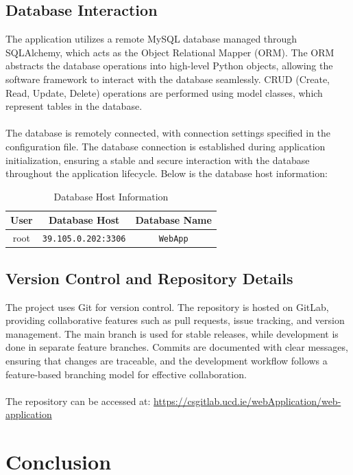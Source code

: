 \documentclass[12pt]{article}
\begin{document}
\subsection{Database Interaction}
The application utilizes a remote MySQL database managed through SQLAlchemy, which acts as the Object Relational Mapper (ORM). The ORM abstracts the database operations into high-level Python objects, allowing the software framework to interact with the database seamlessly. CRUD (Create, Read, Update, Delete) operations are performed using model classes, which represent tables in the database.\\ \\ 
The database is remotely connected, with connection settings specified in the configuration file. The database connection is established during application initialization, ensuring a stable and secure interaction with the database throughout the application lifecycle. Below is the database host information:

\begin{table}[H]
    \centering
    \begin{tabular}{|c|c|c|}
        \hline
        \textbf{User} & \textbf{Database Host} & \textbf{Database Name} \\
        \hline
        root & \texttt{39.105.0.202:3306} & \texttt{WebApp} \\
        \hline
    \end{tabular}
    \caption{Database Host Information}
\end{table}

\subsection{Version Control and Repository Details}
The project uses Git for version control. The repository is hosted on GitLab, providing collaborative features such as pull requests, issue tracking, and version management. The main branch is used for stable releases, while development is done in separate feature branches. Commits are documented with clear messages, ensuring that changes are traceable, and the development workflow follows a feature-based branching model for effective collaboration.\\ \\
The repository can be accessed at: \url{https://csgitlab.ucd.ie/webApplication/web-application}
\newpage
\section{Conclusion}
\end{document}
